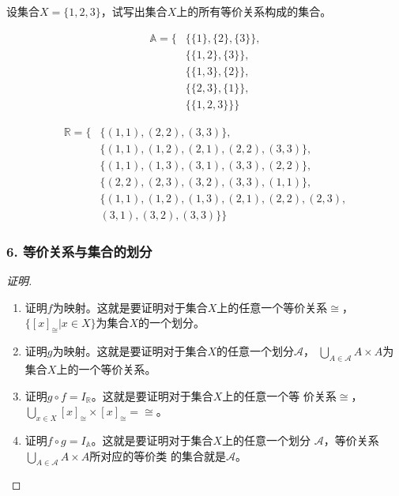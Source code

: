 \documentclass{beamer}
\begin{document}
\begin{CJK*}{UTF8}{gbsn}
\begin{frame}
  设集合$X=\{1,2,3\}$，试写出集合$X$上的所有等价关系构成的集合。
\pause
  \begin{minipage}[t]{0.33\linewidth}
  \begin{equation*}
    \begin{split}
      \mathbb{A}=\{&\{\{1\},\{2\},\{3\}\},\\
      &\{\{1,2\},\{3\}\},\\
      &\{\{1,3\},\{2\}\},\\
      &\{\{2,3\},\{1\}\},\\
      &\{\{1,2,3\}\}\}
    \end{split}
  \end{equation*}\pause
\end{minipage}
\begin{minipage}[t]{0.52\linewidth}
  \begin{equation*}
    \begin{split}
      \mathbb{R}=\{&\{(1,1),(2,2),(3,3)\},\\
      &\{(1,1),(1,2),(2,1),(2,2),(3,3)\},\\
      &\{(1,1),(1,3),(3,1),(3,3),(2,2)\},\\
      &\{(2,2),(2,3),(3,2),(3,3),(1,1)\},\\
      &\{(1,1),(1,2),(1,3),(2,1),(2,2),(2,3),\\
      &(3,1),(3,2),(3,3)\}\}      
    \end{split}
  \end{equation*}
\end{minipage}  
\end{frame}
\begin{frame}
  \frametitle{6. 等价关系与集合的划分}
  \begin{proof}[证明]
    \begin{enumerate}
    \item 证明$f$为映射。这就是要证明对于集合$X$上的任意一个等价关系$\cong$，　
      $\{[x]_{\cong}|x\in X\}$为集合$X$的一个划分。
    \item 证明$g$为映射。这就是要证明对于集合$X$的任意一个划分$\mathscr{A}$，
      $\bigcup_{A\in \mathscr{A}}A\times A$为集合$X$上的一个等价关系。
    \item 证明$g\circ f = I_{\mathbb{R}}$。这就是要证明对于集合$X$上的任意一个等
      价关系$\cong$，$\bigcup_{x\in X}[x]_{\cong}\times [x]_{\cong} = \cong$。
    \item 证明$f\circ g = I_{\mathbb{A}}$。这就是要证明对于集合$X$上的任意一个划分
      $\mathscr{A}$，等价关系$\bigcup_{A \in \mathscr{A}}A\times A$所对应的等价类
      的集合就是$\mathscr{A}$。
    \end{enumerate}
  \end{proof}
  

\end{frame}
\end{CJK*}
\end{document}

